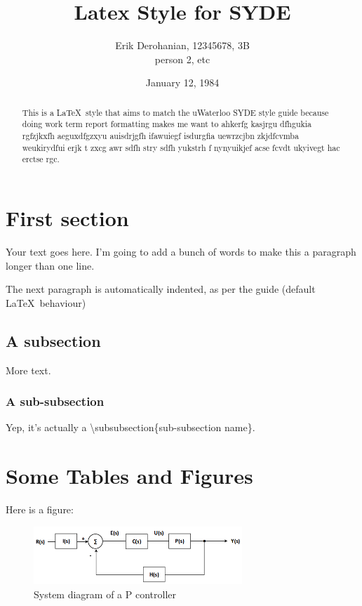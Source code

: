\documentclass[12pt]{article}
\title{Latex Style for SYDE}
\author{Erik Derohanian, 12345678, 3B \\ person 2, etc}
\date{January 12, 1984}
\begin{document}
	\makereporttitle

	\begin{abstract}
		This is a \LaTeX\ style that aims to match the uWaterloo SYDE style guide because doing work term report formatting makes me want to ahkerfg kasjrgu dfhgukia rgfzjkxfh aeguxdfgzxyu auisdrjgfh ifawuiegf isdurgfia uewrzcjbn zkjdfcvmba weukirydfui erjk t  zxcg awr sdfh stry sdfh yukstrh f nynyuikjef acse fcvdt ukyivegt hac erctse rgc.
	\end{abstract}

	\tableofcontents
	\newpage

	\listoffigures
	\newpage
	\listoftables
	\newpage

	\startarabicpagenumbers

	\section{First section}

	Your text goes here. I'm going to add a bunch of words to make this a paragraph longer than one line.

	The next paragraph is automatically indented, as per the guide (default \LaTeX\ behaviour)

	\subsection{A subsection}

	More text.

	\subsubsection{A sub-subsection}

	Yep, it's actually a \textbackslash subsubsection\{sub-subsection name\}.

	\section{Some Tables and Figures}

	Here is a figure:

	\begin{figure}[!ht]
		\centering
		\includegraphics[width=0.7\textwidth]{pcontroller}
		\caption{System diagram of a P controller}
		\label{pcontroller}
	\end{figure}
\end{document}
